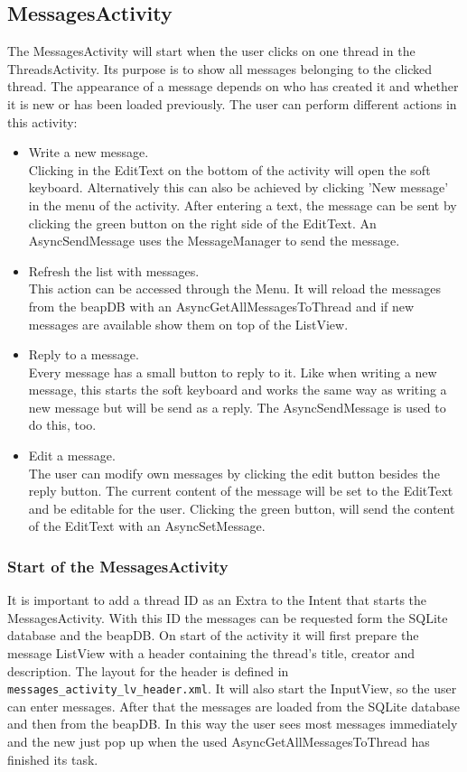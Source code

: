 \documentclass[12pt,a4paper,oneside]{report}
\newcommand{\beapDB}{beapDB}
\newcommand{\code}[1]{\lstinline{#1}}
\begin{document}
\subsection{MessagesActivity}
The MessagesActivity will start when the user clicks on one thread in the ThreadsActivity. Its purpose is to show all messages belonging to the clicked thread. The appearance of a message depends on who has created it and whether it is new or has been loaded previously. The user can perform different actions in this activity:

\begin{itemize}
\item Write a new message.\\
Clicking in the EditText on the bottom of the activity will open the soft keyboard. Alternatively this can also be achieved by clicking 'New message' in the menu of the activity. After entering a text, the message can be sent by clicking the green button on the right side of the EditText. An AsyncSendMessage uses the MessageManager to send the message.

\item Refresh the list with messages.\\
This action can be accessed through the Menu. It will reload the messages from the \beapDB{} with an AsyncGetAllMessagesToThread and if new messages are available show them on top of the ListView.

\item Reply to a message.\\
Every message has a small button to reply to it. Like when writing a new message, this starts the soft keyboard and works the same way as writing a new message but will be send as a reply. The AsyncSendMessage is used to do this, too.

\item Edit a message.\\
The user can modify own messages by clicking the edit button besides the reply button. The current content of the message will be set to the EditText and be editable for the user. Clicking the green button, will send the content of the EditText with an AsyncSetMessage.

\end{itemize}

\subsubsection{Start of the MessagesActivity}
It is important to add a thread ID as an Extra to the Intent that starts the MessagesActivity. With this ID the messages can be requested form the SQLite database and the \beapDB{}. On start of the activity it will first prepare the message ListView with a header containing the thread's title, creator and description. The layout for the header is defined in \code{messages_activity_lv_header.xml}. It will also start the InputView, so the user can enter messages. After that the messages are loaded from the SQLite database and then from the \beapDB{}. In this way the user sees most messages immediately and the new just pop up when the used AsyncGetAllMessagesToThread has finished its task. 
\end{document}
